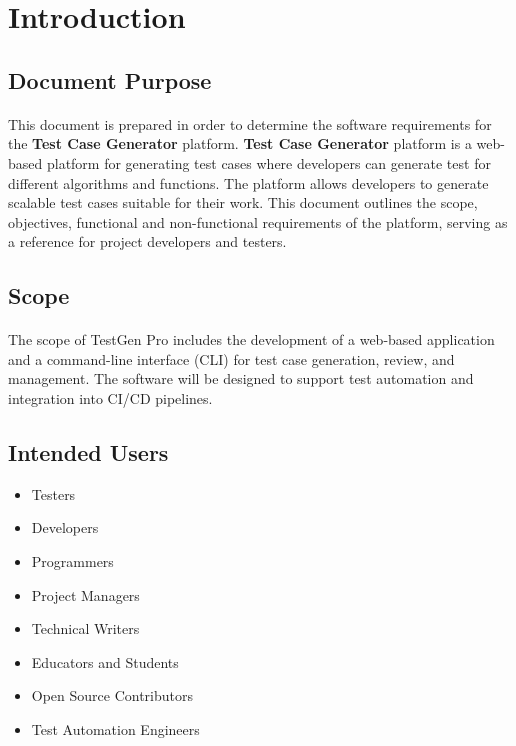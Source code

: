 \documentclass{article}
\begin{document}

\section{Introduction}
\subsection{Document Purpose}
\paragraph{}
This document is prepared in order to determine the software requirements for the
\textbf{Test Case Generator} platform. \textbf{Test Case Generator} platform is a
web-based platform for generating test cases where developers can generate test
for different algorithms and functions. The platform allows developers to generate
scalable test cases suitable for their work. This document outlines the scope,
objectives, functional and non-functional requirements of the platform, serving as
a reference for project developers and testers.

\subsection{Scope}
\paragraph{}
The scope of TestGen Pro includes the development of a web-based application and a
command-line interface (CLI) for test case generation, review, and management. The
software will be designed to support test automation and integration into CI/CD
pipelines.

\subsection{Intended Users}
\begin{itemize}
    \item Testers
    \item Developers
    \item Programmers
    \item Project Managers
    \item Technical Writers
    \item Educators and Students
    \item Open Source Contributors
    \item Test Automation Engineers
\end{itemize}
\end{document}

